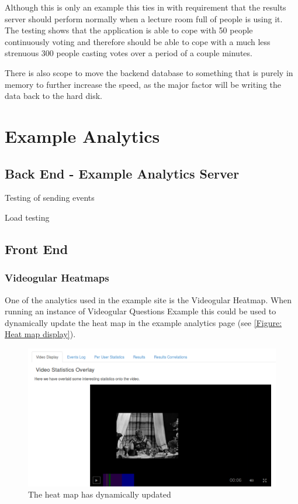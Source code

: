 Although this is only an example this ties in with requirement  that the results server should perform normally when a lecture room full of people is using it. The testing shows that the application is able to cope with 50 people continuously voting and therefore should be able to cope with a much less strenuous 300 people casting votes over a period of a couple minutes.

There is also scope to move the backend database to something that is purely in memory to further increase the speed, as the major factor will be writing the data back to the hard disk.

\section{Example Analytics}

\subsection{Back End - Example Analytics Server}
\label{Subsection:Analytics server in example}
Testing of sending events

Load testing

\subsection{Front End}
\subsubsection{Videogular Heatmaps}
\label{Subsubsection:Videogular Heatmaps in example}

One of the analytics used in the example site is the \gls{Videogular} Heatmap. When running an instance of \gls{Videogular} Questions Example this could be used to dynamically update the heat map in the example analytics page (see \autoref{Figure: Heat map display}).

\begin{figure}[h]
	\centering 
		\includegraphics[scale=0.4]{../figures/heatmapDisplay.png} 		
	\caption{\label{Figure: Heat map display} The heat map has dynamically updated} 	
\end{figure}

